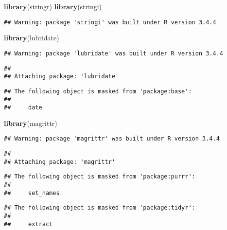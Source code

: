 \documentclass[]{article}
\newenvironment{Shaded}{\begin{snugshade}}{\end{snugshade}}
\newcommand{\KeywordTok}[1]{\textcolor[rgb]{0.13,0.29,0.53}{\textbf{#1}}}
\newcommand{\NormalTok}[1]{#1}
\begin{document}
\begin{Shaded}
\begin{Highlighting}[]
\KeywordTok{library}\NormalTok{(stringr)}
\KeywordTok{library}\NormalTok{(stringi)}
\end{Highlighting}
\end{Shaded}

\begin{verbatim}
## Warning: package 'stringi' was built under R version 3.4.4
\end{verbatim}

\begin{Shaded}
\begin{Highlighting}[]
\KeywordTok{library}\NormalTok{(lubridate)}
\end{Highlighting}
\end{Shaded}

\begin{verbatim}
## Warning: package 'lubridate' was built under R version 3.4.4
\end{verbatim}

\begin{verbatim}
## 
## Attaching package: 'lubridate'
\end{verbatim}

\begin{verbatim}
## The following object is masked from 'package:base':
## 
##     date
\end{verbatim}

\begin{Shaded}
\begin{Highlighting}[]
\KeywordTok{library}\NormalTok{(magrittr)}
\end{Highlighting}
\end{Shaded}

\begin{verbatim}
## Warning: package 'magrittr' was built under R version 3.4.4
\end{verbatim}

\begin{verbatim}
## 
## Attaching package: 'magrittr'
\end{verbatim}

\begin{verbatim}
## The following object is masked from 'package:purrr':
## 
##     set_names
\end{verbatim}

\begin{verbatim}
## The following object is masked from 'package:tidyr':
## 
##     extract
\end{verbatim}
\end{document}
